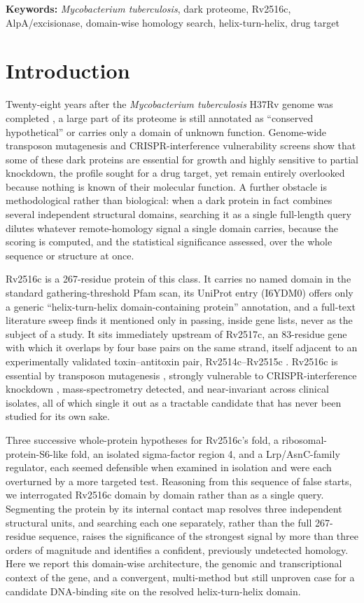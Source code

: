 \documentclass[11pt,a4paper]{article}
\newcommand{\mtb}{\textit{Mycobacterium tuberculosis}}
\begin{document}
\textbf{Keywords:} \textit{Mycobacterium tuberculosis}, dark proteome, Rv2516c, AlpA/excisionase,
domain-wise homology search, helix-turn-helix, drug target

\section{Introduction}

Twenty-eight years after the \mtb{} H37Rv genome was completed \citep{cole1998genome}, a large part
of its proteome is still annotated as ``conserved hypothetical'' or carries only a domain of
unknown function. Genome-wide transposon mutagenesis \citep{dejesus2017essentiality} and
CRISPR-interference vulnerability screens \citep{bosch2021vulnerability} show that some of these
dark proteins are essential for growth and highly sensitive to partial knockdown, the profile
sought for a drug target, yet remain entirely overlooked because nothing is known of their
molecular function. A further obstacle is methodological rather than biological: when a dark
protein in fact combines several independent structural domains, searching it as a single
full-length query dilutes whatever remote-homology signal a single domain carries, because the
scoring is computed, and the statistical significance assessed, over the whole sequence or
structure at once.

Rv2516c is a 267-residue protein of this class. It carries no named domain in the standard
gathering-threshold Pfam scan, its UniProt entry (I6YDM0) offers only a generic
``helix-turn-helix domain-containing protein'' annotation, and a full-text literature sweep finds
it mentioned only in passing, inside gene lists, never as the subject of a study. It sits
immediately upstream of Rv2517c, an 83-residue gene with which it overlaps by four base pairs on
the same strand, itself adjacent to an experimentally validated toxin--antitoxin pair,
Rv2514c--Rv2515c \citep{tandon2019ta}. Rv2516c is essential by transposon mutagenesis
\citep{dejesus2017essentiality}, strongly vulnerable to CRISPR-interference knockdown
\citep{bosch2021vulnerability}, mass-spectrometry detected, and near-invariant across clinical
isolates, all of which single it out as a tractable candidate that has never been studied for its
own sake.

Three successive whole-protein hypotheses for Rv2516c's fold, a ribosomal-protein-S6-like fold, an
isolated sigma-factor region 4, and a Lrp/AsnC-family regulator, each seemed defensible when
examined in isolation and were each overturned by a more targeted test. Reasoning from this
sequence of false starts, we interrogated Rv2516c domain by domain rather than as a single query.
Segmenting the protein by its internal contact map resolves three independent structural units,
and searching each one separately, rather than the full 267-residue sequence, raises the
significance of the strongest signal by more than three orders of magnitude and identifies a
confident, previously undetected homology. Here we report this domain-wise architecture, the
genomic and transcriptional context of the gene, and a convergent, multi-method but still
unproven case for a candidate DNA-binding site on the resolved helix-turn-helix domain.
\end{document}
